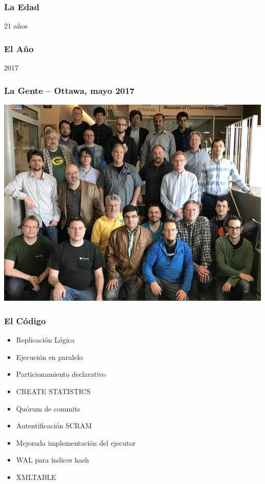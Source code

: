 \begin{frame}
\frametitle{La Edad}

\begin{center}
\Huge{21 años}
\end{center}
\end{frame}

\begin{frame}
\frametitle{El Año}

\begin{center}
\Huge{2017}
\end{center}
\end{frame}

\begin{frame}
\frametitle{La Gente -- Ottawa, mayo 2017}
\begin{center}
\includegraphics[width=\textwidth]{devmeet-2017.jpg}
\end{center}
\end{frame}

\begin{frame}
\frametitle{El Código}

\begin{itemize}
\item Replicación Lógica
\item Ejecución en paralelo
\item Particionamiento declarativo
\item CREATE STATISTICS
\item Quórum de commits
\item Autentificación SCRAM
\item Mejorada implementación del ejecutor
\item WAL para índices hash
\item XMLTABLE

\end{itemize}
\end{frame}


